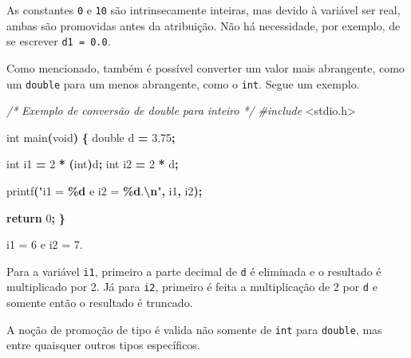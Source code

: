 \documentclass[
  11pt,
  a4paper,
]{scrbook}
\newenvironment{Shaded}{\begin{snugshade}}{\end{snugshade}}
\newcommand{\CommentTok}[1]{\textcolor[rgb]{0.56,0.35,0.01}{\textit{#1}}}
\newcommand{\ControlFlowTok}[1]{\textcolor[rgb]{0.13,0.29,0.53}{\textbf{#1}}}
\newcommand{\DataTypeTok}[1]{\textcolor[rgb]{0.13,0.29,0.53}{#1}}
\newcommand{\DecValTok}[1]{\textcolor[rgb]{0.00,0.00,0.81}{#1}}
\newcommand{\FloatTok}[1]{\textcolor[rgb]{0.00,0.00,0.81}{#1}}
\newcommand{\ImportTok}[1]{#1}
\newcommand{\NormalTok}[1]{#1}
\newcommand{\OperatorTok}[1]{\textcolor[rgb]{0.81,0.36,0.00}{\textbf{#1}}}
\newcommand{\PreprocessorTok}[1]{\textcolor[rgb]{0.56,0.35,0.01}{\textit{#1}}}
\newcommand{\SpecialCharTok}[1]{\textcolor[rgb]{0.81,0.36,0.00}{\textbf{#1}}}
\newcommand{\StringTok}[1]{\textcolor[rgb]{0.31,0.60,0.02}{#1}}
\begin{document}
As constantes \texttt{0} e \texttt{10} são intrinsecamente inteiras, mas
devido à variável ser real, ambas são promovidas antes da atribuição.
Não há necessidade, por exemplo, de se escrever \texttt{d1\ =\ 0.0}.

Como mencionado, também é possível converter um valor mais abrangente,
como um \texttt{double} para um menos abrangente, como o \texttt{int}.
Segue um exemplo.

\begin{Shaded}
\begin{Highlighting}[]
\CommentTok{/*}
\CommentTok{Exemplo de conversão de double para inteiro}
\CommentTok{*/}
\PreprocessorTok{\#include }\ImportTok{\textless{}stdio.h\textgreater{}}

\DataTypeTok{int}\NormalTok{ main}\OperatorTok{(}\DataTypeTok{void}\OperatorTok{)} \OperatorTok{\{}
    \DataTypeTok{double}\NormalTok{ d }\OperatorTok{=} \FloatTok{3.75}\OperatorTok{;}

    \DataTypeTok{int}\NormalTok{ i1 }\OperatorTok{=} \DecValTok{2} \OperatorTok{*} \OperatorTok{(}\DataTypeTok{int}\OperatorTok{)}\NormalTok{d}\OperatorTok{;}
    \DataTypeTok{int}\NormalTok{ i2 }\OperatorTok{=} \DecValTok{2} \OperatorTok{*}\NormalTok{ d}\OperatorTok{;}

\NormalTok{    printf}\OperatorTok{(}\StringTok{"i1 = }\SpecialCharTok{\%d}\StringTok{ e i2 = }\SpecialCharTok{\%d}\StringTok{.}\SpecialCharTok{\textbackslash{}n}\StringTok{"}\OperatorTok{,}\NormalTok{ i1}\OperatorTok{,}\NormalTok{ i2}\OperatorTok{);}

    \ControlFlowTok{return} \DecValTok{0}\OperatorTok{;}
\OperatorTok{\}}
\end{Highlighting}
\end{Shaded}

\begin{Shaded}
\begin{Highlighting}[]
\NormalTok{i1 = 6 e i2 = 7.}
\end{Highlighting}
\end{Shaded}

Para a variável \texttt{i1}, primeiro a parte decimal de \texttt{d} é
eliminada e o resultado é multiplicado por 2. Já para \texttt{i2},
primeiro é feita a multiplicação de 2 por \texttt{d} e somente então o
resultado é truncado.

A noção de promoção de tipo é valida não somente de \texttt{int} para
\texttt{double}, mas entre quaisquer outros tipos específicos.
\end{document}
